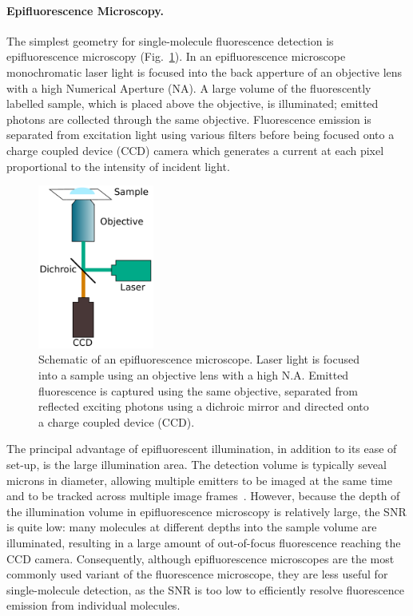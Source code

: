 \paragraph{Epifluorescence Microscopy.}
The simplest geometry for single-molecule fluorescence detection is epifluorescence microscopy (Fig.~\ref{fig:epi}). In an epifluorescence microscope monochromatic laser light is focused into the back apperture of an objective lens with a high Numerical Aperture (NA). A large volume of the fluorescently labelled sample, which is placed above the objective, is illuminated; emitted photons are collected through the same objective. Fluorescence emission is separated from excitation light using various filters before being focused onto a charge coupled device (CCD) camera which generates a current at each pixel proportional to the intensity of incident light.

\begin{figure}
	\begin{center}
	\includegraphics*[clip=true, width=1.5in]{introduction/epi.pdf}
	\caption{Schematic of an epifluorescence microscope. Laser light is focused into a sample using an objective lens with a high N.A. Emitted fluorescence is captured using the same objective, separated from reflected exciting photons using a dichroic mirror and directed onto a charge coupled device (CCD).}
	\label{fig:epi}
	\end{center}
\end{figure}

The principal advantage of epifluorescent illumination, in addition to its ease of set-up, is the large illumination area. The detection volume is typically seveal microns in diameter, allowing multiple emitters to be imaged at the same time and to be tracked across multiple image frames~\cite{Webb2014}. However, because the depth of the illumination volume in epifluorescence microscopy is relatively large, the SNR is quite low: many molecules at different depths into the sample volume are illuminated, resulting in a large amount of out-of-focus fluorescence reaching the CCD camera. Consequently, although epifluorescence microscopes are the most commonly used variant of the fluorescence microscope, they are less useful for single-molecule detection, as the SNR is too low to efficiently resolve fluorescence emission from individual molecules.

